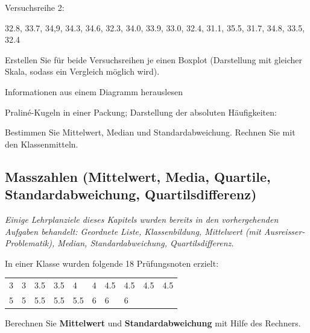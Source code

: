   Versuchsreihe 2:

  32.8, 33.7, 34,9, 34.3, 34.6, 32.3, 34.0, 33.9, 33.0, 32.4,
  31.1, 35.5, 31.7, 34.8, 33.5, 32.4

  Erstellen Sie für beide Versuchsreihen je einen Boxplot (Darstellung
  mit gleicher Skala, sodass ein Vergleich möglich wird).










{Informationen aus einem Diagramm herauslesen}

    Praliné-Kugeln in einer Packung; Darstellung der absoluten
    Häufigkeiten:
    

Bestimmen Sie Mittelwert, Median und Standardabweichung.
Rechnen Sie mit den Klassenmitteln.


\newpage














\subsection{Masszahlen (Mittelwert, Media, Quartile,
  Standardabweichung, Quartilsdifferenz)}

\textit{Einige Lehrplanziele dieses Kapitels wurden bereits in den
  vorhergehenden Aufgaben behandelt: Geordnete Liste, Klassenbildung,
  Mittelwert (mit Ausreisser-Problematik), Median, Standardabweichung,
  Quartilsdifferenz.}

 In einer Klasse wurden folgende 18 Prüfungsnoten erzielt:

  \begin{tabular}{llllllllll}
    3 & 3 & 3.5 & 3.5 & 4   & 4 & 4.5 & 4.5 & 4.5 & 4.5\\
    5 & 5 & 5.5 & 5.5 & 5.5 & 6 & 6   & 6
  \end{tabular}

  Berechnen Sie \textbf{Mittelwert} und \textbf{Standardabweichung}
  mit Hilfe des Rechners.









